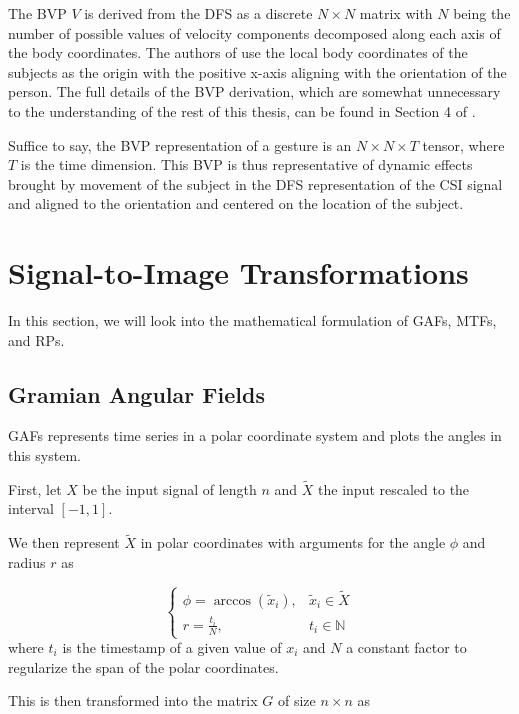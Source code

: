 The BVP $V$ is derived from the DFS as a discrete $N \times N$ matrix with $N$ being the number of possible values of velocity components decomposed along each axis of the body coordinates.
The authors of \cite{zheng2019zero} use the local body coordinates of the subjects as the origin with the positive x-axis aligning with the orientation of the person.
The full details of the BVP derivation, which are somewhat unnecessary to the understanding of the rest of this thesis, can be found in Section 4 of \cite{zheng2019zero}.

Suffice to say, the BVP representation of a gesture is an $N \times N \times T$ tensor, where $T$ is the time dimension.
This BVP is thus representative of dynamic effects brought by movement of the subject in the DFS representation of the CSI signal and aligned to the orientation and centered on the location of the subject.

\section{Signal-to-Image Transformations}\label{sec:background-signal-to-image}

In this section, we will look into the mathematical formulation of GAFs, MTFs, and RPs.

\subsection{Gramian Angular Fields}

GAFs \cite{wang2015imaging} represents time series in a polar coordinate system and plots the angles in this system.

First, let $X$ be the input signal of length $n$ and $\tilde{X}$ the input rescaled to the interval $[-1, 1]$.

We then represent $\tilde{X}$ in polar coordinates with arguments for the angle $\phi$ and radius $r$ as

\begin{equation}
	\begin{cases}
		\phi = \arccos(\tilde{x}_i), & \tilde{x}_i \in \tilde{X} \\
		r = \frac{t_i}{N}, & t_{i} \in \mathbb{N}
	\end{cases}
\end{equation}
where $t_{i}$ is the timestamp of a given value of $x_i$ and $N$ a constant factor to regularize the span of the polar coordinates.

This is then transformed into the matrix $G$ of size $n \times n$ as

